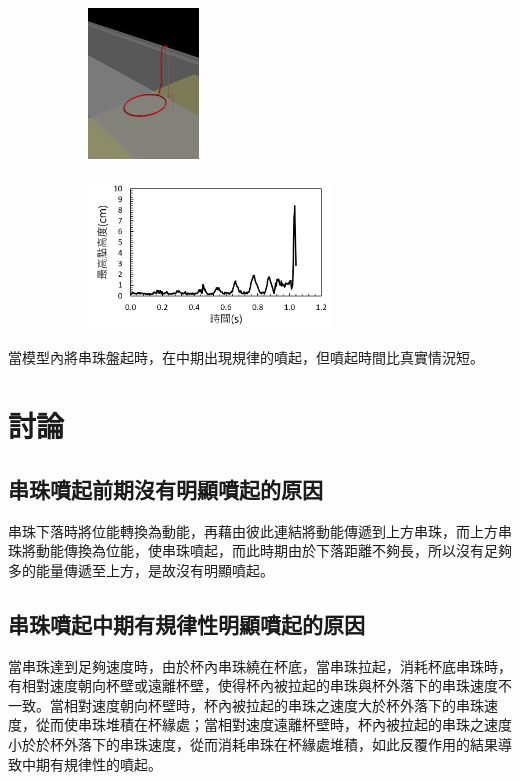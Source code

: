 \documentclass[11pt,twoside,b5paper]{article}
\begin{document}
\begin{figure}[H]
    \centering
    \begin{subfigure}[t]{0.3\linewidth}
    \includegraphics[height=4cm]{2.png}
    \end{subfigure}
    \begin{subfigure}[t]{0.65\linewidth}
    \includegraphics[height=4cm]{2b.PNG}
    \end{subfigure}
\end{figure}

當模型內將串珠盤起時，在中期出現規律的噴起，但噴起時間比真實情況短。

\section{討論}

\subsection{串珠噴起前期沒有明顯噴起的原因}
串珠下落時將位能轉換為動能，再藉由彼此連結將動能傳遞到上方串珠，而上方串珠將動能傳換為位能，使串珠噴起，而此時期由於下落距離不夠長，所以沒有足夠多的能量傳遞至上方，是故沒有明顯噴起。

\subsection{串珠噴起中期有規律性明顯噴起的原因}
當串珠達到足夠速度時，由於杯內串珠繞在杯底，當串珠拉起，消耗杯底串珠時，有相對速度朝向杯壁或遠離杯壁，使得杯內被拉起的串珠與杯外落下的串珠速度不一致。當相對速度朝向杯壁時，杯內被拉起的串珠之速度大於杯外落下的串珠速度，從而使串珠堆積在杯緣處；當相對速度遠離杯壁時，杯內被拉起的串珠之速度小於於杯外落下的串珠速度，從而消耗串珠在杯緣處堆積，如此反覆作用的結果導致中期有規律性的噴起。
\end{document}
